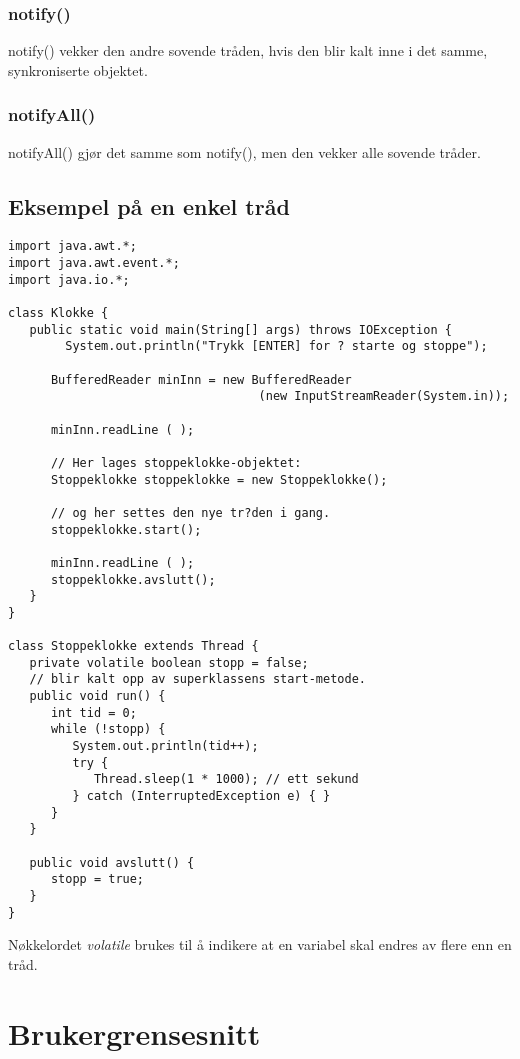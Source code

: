 \documentclass[a4paper,norsk,10pt]{article}
\begin{document}
\subsubsection{notify()}
\label{sec-21.4.2}


notify() vekker den andre sovende tråden, hvis den blir kalt inne i
det samme, synkroniserte objektet.
\subsubsection{notifyAll()}
\label{sec-21.4.3}


notifyAll() gjør det samme som notify(), men den vekker alle sovende tråder.
\subsection{Eksempel på en enkel tråd}
\label{sec-21.5}


\begin{verbatim}
import java.awt.*;
import java.awt.event.*;
import java.io.*;

class Klokke {
   public static void main(String[] args) throws IOException {
        System.out.println("Trykk [ENTER] for ? starte og stoppe");
   
      BufferedReader minInn = new BufferedReader
                                   (new InputStreamReader(System.in));

      minInn.readLine ( );
 
      // Her lages stoppeklokke-objektet:
      Stoppeklokke stoppeklokke = new Stoppeklokke();

      // og her settes den nye tr?den i gang.
      stoppeklokke.start();

      minInn.readLine ( );
      stoppeklokke.avslutt();
   }
}

class Stoppeklokke extends Thread {
   private volatile boolean stopp = false;
   // blir kalt opp av superklassens start-metode.
   public void run() {
      int tid = 0;
      while (!stopp) {
         System.out.println(tid++);
         try {
            Thread.sleep(1 * 1000); // ett sekund
         } catch (InterruptedException e) { }
      }
   }

   public void avslutt() {
      stopp = true;
   }
}
\end{verbatim}

Nøkkelordet \emph{volatile} brukes til å indikere at en variabel skal
endres av flere enn en tråd.
\section{Brukergrensesnitt}
\label{sec-22}
\end{document}

